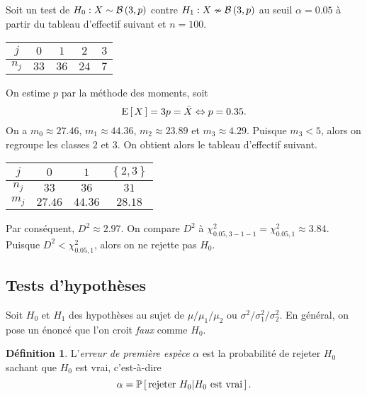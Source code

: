 \documentclass[11pt]{article}
\makeatletter
\newcommand\Pg[2]{%
	\ensuremath{%
		\mathbb{P}\left[\,#1\middle\rvert#2\,\right]%
	}%
}%
\newcommand\Bin[2]{%
	\ensuremath{%
		\mathcal{B}\left(#1,#2\right)%
	}%
}%
\newcommand\Esp[1]{%
	\ensuremath{%
		\mathrm{E}\left[\,#1\,\right]%
	}%
}%
\theoremstyle{remark}
\theoremstyle{definition}
\newtheorem*{@definition}{Définition}
\newenvironment{definition}{%
	\begin{@definition}%
}{%
	\end{@definition}%
	\setcounter{property}{0}%
}
\makeatother
\begin{document}
\begin{exemple}
	Soit un test de $H_0:X\sim\Bin{3}{p}$ contre $H_1:X\nsim\Bin{3}{p}$ au
	seuil $\alpha=0.05$ à partir du tableau d'effectif suivant et $n=100$.
	\begin{table}[H]
		\centering
		\begin{tabular}{c|cccc}
			\toprule
			$j$   & $0$  & $1$  & $2$  & $3$\\
			\midrule
			$n_j$ & $33$ & $36$ & $24$ & $7$\\
			\bottomrule
		\end{tabular}
	\end{table}

	On estime $p$ par la méthode des moments, soit
	\begin{equation*}
		\Esp{X}=3p=\bar{X}\Leftrightarrow p=0.35.
	\end{equation*}
	On a $m_0\approx 27.46$, $m_1\approx 44.36$, $m_2\approx 23.89$ et
	$m_3\approx 4.29$. Puisque $m_3<5$, alors on regroupe les classes $2$ et
	$3$. On obtient alors le tableau d'effectif suivant.
	\begin{table}[H]
		\centering
		\begin{tabular}{c|ccc}
			\toprule
			$j$   & $0$     & $1$     & $\left\{2,3\right\}$\\
			\midrule
			$n_j$ & $33$    & $36$    & $31$\\
			$m_j$ & $27.46$ & $44.36$ & $28.18$\\
			\bottomrule
		\end{tabular}
	\end{table}

	Par conséquent, $D^2\approx 2.97$. On compare $D^2$ à $\chi^2_{0.05,3-1-1}=
	\chi^2_{0.05,1}\approx 3.84$. Puisque $D^2<\chi^2_{0.05,1}$, alors on ne
	rejette pas $H_0$.
\end{exemple}

\subsection{Tests d'hypothèses}
Soit $H_0$ et $H_1$ des hypothèses au sujet de $\mu/\mu_1/\mu_2$ ou $\sigma^2/
\sigma_1^2/\sigma_2^2$. En général, on pose un énoncé que l'on croit \textit{%
faux} comme $H_0$.

\begin{definition}
	L'\textit{erreur de première espèce} $\alpha$ est la probabilité de
	rejeter $H_0$ sachant que $H_0$ est vrai, c'est-à-dire
	\begin{equation*}
		\alpha=\Pg{\text{rejeter $H_0$}}{\text{$H_0$ est vrai}}.
	\end{equation*}
\end{definition}
\end{document}

